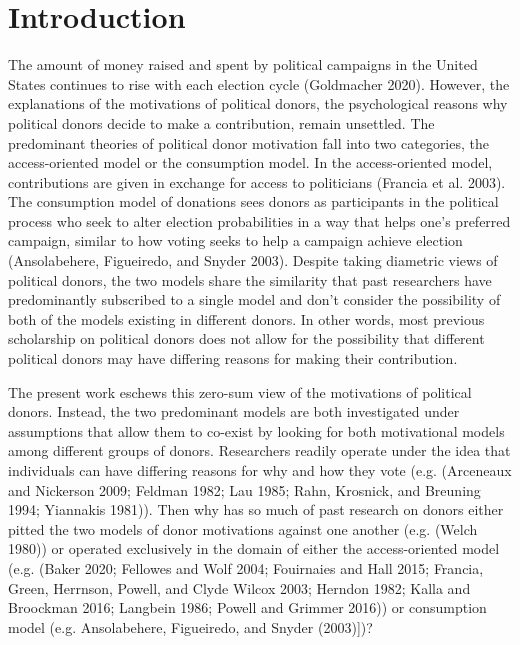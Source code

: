 \documentclass[12pt,]{article}
\begin{document}
\newpage

\hypertarget{introduction}{%
\section{Introduction}\label{introduction}}

The amount of money raised and spent by political campaigns in the
United States continues to rise with each election cycle (Goldmacher
2020). However, the explanations of the motivations of political donors,
the psychological reasons why political donors decide to make a
contribution, remain unsettled. The predominant theories of political
donor motivation fall into two categories, the access-oriented model or
the consumption model. In the access-oriented model, contributions are
given in exchange for access to politicians (Francia et al. 2003). The
consumption model of donations sees donors as participants in the
political process who seek to alter election probabilities in a way that
helps one's preferred campaign, similar to how voting seeks to help a
campaign achieve election (Ansolabehere, Figueiredo, and Snyder 2003).
Despite taking diametric views of political donors, the two models share
the similarity that past researchers have predominantly subscribed to a
single model and don't consider the possibility of both of the models
existing in different donors. In other words, most previous scholarship
on political donors does not allow for the possibility that different
political donors may have differing reasons for making their
contribution.

The present work eschews this zero-sum view of the motivations of
political donors. Instead, the two predominant models are both
investigated under assumptions that allow them to co-exist by looking
for both motivational models among different groups of donors.
Researchers readily operate under the idea that individuals can have
differing reasons for why and how they vote (e.g. (Arceneaux and
Nickerson 2009; Feldman 1982; Lau 1985; Rahn, Krosnick, and Breuning
1994; Yiannakis 1981)). Then why has so much of past research on donors
either pitted the two models of donor motivations against one another
(e.g. (Welch 1980)) or operated exclusively in the domain of either the
access-oriented model (e.g. (Baker 2020; Fellowes and Wolf 2004;
Fouirnaies and Hall 2015; Francia, Green, Herrnson, Powell, and Clyde
Wilcox 2003; Herndon 1982; Kalla and Broockman 2016; Langbein 1986;
Powell and Grimmer 2016)) or consumption model (e.g. Ansolabehere,
Figueiredo, and Snyder (2003){]})?
\end{document}
